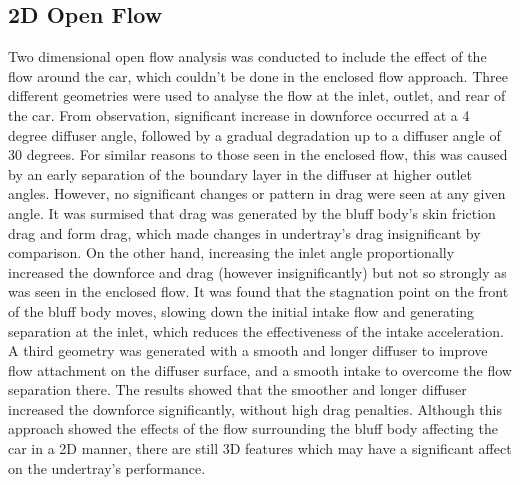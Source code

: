\subsection*{2D Open Flow}
Two dimensional open flow analysis was conducted to include the effect of the flow around the car, which couldn't be done in the enclosed flow approach. Three different geometries were used to analyse the flow at the inlet, outlet, and rear of the car. From observation, significant increase in downforce occurred at a 4 degree diffuser angle, followed by a gradual degradation up to a diffuser angle of 30 degrees. For similar reasons to those seen in the enclosed flow, this was caused by an early separation of the boundary layer in the diffuser at higher outlet angles. However, no significant changes or pattern in drag were seen at any given angle. It was surmised that drag was generated by the bluff body's skin friction drag and form drag, which made changes in undertray's drag insignificant by comparison. On the other hand, increasing the inlet angle proportionally increased the downforce and drag (however insignificantly) but not so strongly as was seen in the enclosed flow. It was found that the stagnation point on the front of the bluff body moves, slowing down the initial intake flow and generating separation at the inlet, which reduces the effectiveness of the intake acceleration. A third geometry was generated with a smooth and longer diffuser to improve flow attachment on the diffuser surface, and a smooth intake to overcome the flow separation there. The results showed that the smoother and longer diffuser increased the downforce significantly, without high drag penalties. Although this approach showed the effects of the flow surrounding the bluff body affecting the car in a 2D manner, there are still 3D features which may have a significant affect on the undertray's performance.

